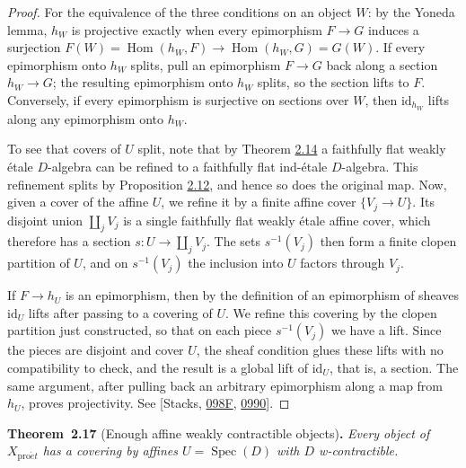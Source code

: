 \documentclass[11pt]{article}
\newenvironment{bpstatement}[2]{\par\addvspace{0.6\baselineskip}\noindent\textbf{#1}#2\textbf{.}\enspace\ignorespaces}
  {\par\addvspace{0.4\baselineskip}}
\newenvironment{bpstatementit}[2]{\begin{bpstatement}{#1}{#2}\itshape\ignorespaces}{\end{bpstatement}}
\providecommand{\Hom}{}\renewcommand{\Hom}{\operatorname{Hom}}
\begin{document}
\begin{proof}[{Proof}]\label{bp48}%
For the equivalence of the three conditions on an object \(W\): by the Yoneda lemma, \(h_W\) is projective exactly when every epimorphism \(F\to G\) induces a surjection \(F(W)=\Hom(h_W,F)\to\Hom(h_W,G)=G(W)\). If every epimorphism onto \(h_W\) splits, pull an epimorphism \(F\to G\) back along a section \(h_W\to G\); the resulting epimorphism onto \(h_W\) splits, so the section lifts to \(F\). Conversely, if every epimorphism is surjective on sections over \(W\), then \(\mathrm{id}_{h_W}\) lifts along any epimorphism onto \(h_W\).

To see that covers of \(U\) split, note that by Theorem \hyperref[bp40]{2.14} a faithfully flat weakly étale \(D\)-algebra can be refined to a faithfully flat ind-étale \(D\)-algebra. This refinement splits by Proposition \hyperref[bp34]{2.12}, and hence so does the original map. Now, given a cover of the affine \(U\), we refine it by a finite affine cover \(\{V_j\to U\}\). Its disjoint union \(\coprod_jV_j\) is a single faithfully flat weakly étale affine cover, which therefore has a section \(s:U\to\coprod_jV_j\). The sets \(s^{-1}(V_j)\) then form a finite clopen partition of \(U\), and on \(s^{-1}(V_j)\) the inclusion into \(U\) factors through \(V_j\).

If \(F\to h_U\) is an epimorphism, then by the definition of an epimorphism of sheaves \(\mathrm{id}_U\) lifts after passing to a covering of \(U\). We refine this covering by the clopen partition just constructed, so that on each piece \(s^{-1}(V_j)\) we have a lift. Since the pieces are disjoint and cover \(U\), the sheaf condition glues these lifts with no compatibility to check, and the result is a global lift of \(\mathrm{id}_U\), that is, a section. The same argument, after pulling back an arbitrary epimorphism along a map from \(h_U\), proves projectivity. See [Stacks, \href{https://stacks.math.columbia.edu/tag/098F}{098F}, \href{https://stacks.math.columbia.edu/tag/0990}{0990}].
\end{proof}

\label{bp49}%
\begin{bpstatementit}{Theorem~2.17}{ (Enough affine weakly contractible objects)}
Every object of \(X_{\mathrm{pro}\acute{e}t}\) has a covering by affines \(U=\operatorname{Spec}(D)\) with \(D\) w-contractible.
\end{bpstatementit}
\end{document}
